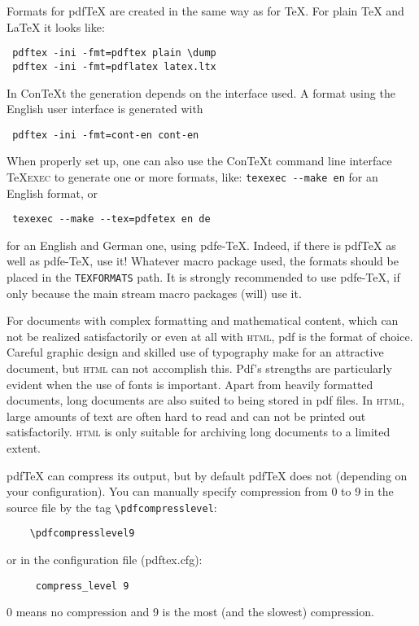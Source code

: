 \documentclass{article}
\begin{document}

Formats for pdf\TeX{} are created in the same way as for
 \TeX. For plain \TeX{} and \LaTeX{} it looks like:
\begin{verbatim}
 pdftex -ini -fmt=pdftex plain \dump
 pdftex -ini -fmt=pdflatex latex.ltx
\end{verbatim}
 In Con\TeX{}t the generation depends on the interface used.
 A format using the English user interface is generated with
\begin{verbatim}
 pdftex -ini -fmt=cont-en cont-en
\end{verbatim}

 When properly set up, one can also use the
 Con\TeX{}t command line interface \TeX\textsc{exec}
 to generate one or more formats, like:
 \verb+texexec --make en+ for an English format,
 or
\begin{verbatim}
 texexec --make --tex=pdfetex en de
\end{verbatim}
 for an English and German one, using pdfe-\TeX.
 Indeed, if there is pdf\TeX{} as well as pdfe-\TeX,
 use it! Whatever macro package used, the formats should
 be placed in the \verb+TEXFORMATS+ path. It is strongly
 recommended to use pdfe-\TeX, if only because the main
 stream macro packages (will) use it.


For documents with complex formatting and mathematical content, which
can not be realized satisfactorily or even at all with \textsc{html},
pdf is the format of choice. Careful graphic design and skilled use of
typography make for an attractive document, but \textsc{html} can not
accomplish this. Pdf's strengths are particularly evident when the use
of fonts is important. Apart from heavily formatted documents, long
documents are also suited to being stored in pdf files. In
\textsc{html}, large amounts of text are often hard to read and can not
be printed out satisfactorily. \textsc{html} is only suitable for
archiving long documents to a limited extent.



pdf\TeX{} can compress its output, but by default pdf\TeX{} does not
  (depending on your configuration). You can manually specify
  compression from 0 to 9 in the source file by the tag
  \verb+\pdfcompresslevel+:
\begin{verbatim}
    \pdfcompresslevel9
\end{verbatim}
  or in the configuration file (pdftex.cfg):
\begin{verbatim}
     compress_level 9
\end{verbatim}
  0 means no compression and 9 is the most (and the slowest)
  compression.
\end{document}
